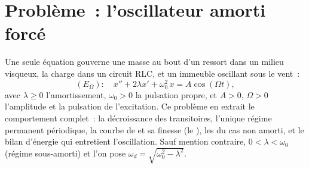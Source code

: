 \section{Problème~: l'oscillateur amorti forcé}

\begin{problem}\label{pb:b1:diffeq:1}
Une seule équation gouverne une masse au bout d'un ressort dans un
milieu visqueux, la charge dans un circuit RLC, et un immeuble
oscillant sous le vent~:
\[
(E_\Omega)\colon\quad
x'' + 2\lambda x' + \omega_0^2\,x = A\cos(\Omega t),
\]
avec $\lambda \geq 0$ l'amortissement, $\omega_0 > 0$ la pulsation
propre, et $A > 0$, $\Omega > 0$ l'amplitude et la pulsation de
l'excitation. Ce problème en extrait le comportement complet~: la
décroissance des transitoires, l'unique régime permanent périodique,
la courbe de  et sa finesse (le \emph{}),
les  du cas non amorti, et le bilan d'énergie qui entretient
l'oscillation.
Sauf mention contraire, $0 < \lambda < \omega_0$ (régime
sous-amorti) et l'on pose $\omega_d = \sqrt{\omega_0^2 - \lambda^2}$.


\end{problem}

